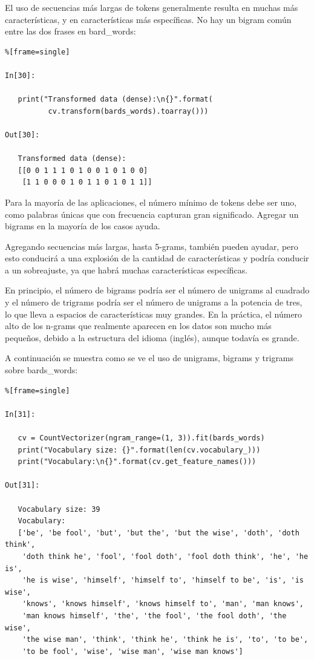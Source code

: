 El uso de secuencias más largas de tokens generalmente resulta en muchas más características,
y en características más específicas. No hay un bigram común entre las dos frases en
 {\ttfamily bard\_words}:


\begin{lstlisting}%[frame=single]

In[30]:

   print("Transformed data (dense):\n{}".format(
          cv.transform(bards_words).toarray()))

Out[30]:

   Transformed data (dense):
   [[0 0 1 1 1 0 1 0 0 1 0 1 0 0]
    [1 1 0 0 0 1 0 1 1 0 1 0 1 1]]

\end{lstlisting}

Para la mayoría de las aplicaciones, el número mínimo de tokens debe ser uno, 
como  palabras  únicas que con frecuencia capturan gran significado. Agregar un bigrams en 
la mayoría de los casos ayuda. 

Agregando secuencias más largas, hasta  5-grams, también pueden ayudar, pero esto conducirá 
a una explosión de la cantidad de características y podría conducir a un sobreajuste, 
ya que habrá muchas características específicas. 

En principio, el número de bigrams podría ser el número de unigrams al cuadrado y el número de trigrams podría ser el número de unigrams a la potencia de tres, lo que lleva a espacios de características muy grandes. En la práctica, el número alto de los n-grams  que realmente aparecen en los datos son mucho más pequeños, debido a la estructura  del idioma (inglés), aunque todavía es grande.

A continuación se muestra   como se ve el uso de unigrams, bigrams y trigrams sobre {\ttfamily bards\_words}:

\begin{lstlisting}%[frame=single]

In[31]:

   cv = CountVectorizer(ngram_range=(1, 3)).fit(bards_words)
   print("Vocabulary size: {}".format(len(cv.vocabulary_)))
   print("Vocabulary:\n{}".format(cv.get_feature_names()))

Out[31]:

   Vocabulary size: 39
   Vocabulary:
   ['be', 'be fool', 'but', 'but the', 'but the wise', 'doth', 'doth think',
    'doth think he', 'fool', 'fool doth', 'fool doth think', 'he', 'he is',
    'he is wise', 'himself', 'himself to', 'himself to be', 'is', 'is wise',
    'knows', 'knows himself', 'knows himself to', 'man', 'man knows',
    'man knows himself', 'the', 'the fool', 'the fool doth', 'the wise',
    'the wise man', 'think', 'think he', 'think he is', 'to', 'to be',
    'to be fool', 'wise', 'wise man', 'wise man knows']

\end{lstlisting}


